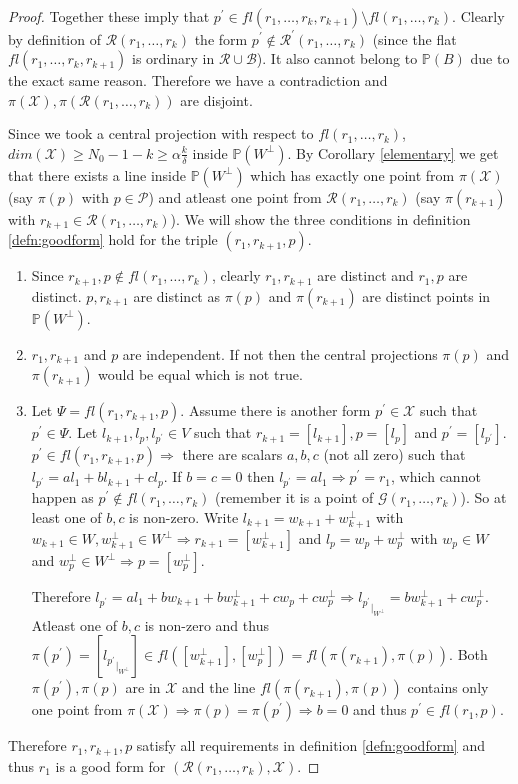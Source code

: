 \documentclass[12pt]{caltech_thesis}
\theoremstyle{plain}
\theoremstyle{definition}
\newcommand{\MB}{\mathcal{B}}
\newcommand{\MP}{\mathcal{P}}
\newcommand{\MR}{\mathcal{R}}
\newcommand{\MG}{\mathcal{G}}
\newcommand{\MX}{\mathcal{X}}
\newcommand{\PP}{\mathbb{P}}
\begin{document}
\begin{proof}
Together these imply that $p^\prime \in fl(r_1,\ldots,r_k,r_{k+1})\setminus fl(r_1,\ldots,r_k)$. Clearly by definition of $\MR(r_1,\ldots,r_k)$
the form $p^\prime\notin \MR^\prime(r_1,\ldots,r_k)$ (since the flat $fl(r_1,\ldots,r_k,r_{k+1})$ is ordinary in $\MR\cup \MB$). It also cannot 
belong to $\PP(B)$ due to the exact same reason. Therefore we have a contradiction and $\pi(\MX), \pi(\MR(r_1,\ldots,r_k))$ are disjoint.

Since we took a central projection with respect to $fl(r_1,\ldots,r_k)$, $dim(\MX) \geq N_0-1-k \geq \alpha \frac{k}{\delta}$ inside $\PP(W^\perp)$. By Corollary
\ref{elementary} we get that there exists a line inside $\PP(W^\perp)$ which has exactly one point from $\pi(\MX)$ (say $\pi(p)$ with $p\in \MP$)
and atleast one point from $\MR(r_1,\ldots,r_k)$ (say $\pi(r_{k+1})$ with $r_{k+1}\in \MR(r_1,\ldots,r_k)$). We will show the three conditions in
definition \ref{defn:goodform} hold for the triple $(r_1, r_{k+1}, p)$.
\begin{enumerate}
 \item Since $r_{k+1},p\notin fl(r_1,\ldots,r_k)$, clearly $r_1,r_{k+1}$ are distinct and $r_1,p$ are distinct. $p,r_{k+1}$ are distinct as
 $\pi(p)$ and $\pi(r_{k+1})$ are distinct points in $\PP(W^\perp)$.
 \item $r_1,r_{k+1}$ and $p$ are independent. If not then the central projections $\pi(p)$ and $\pi(r_{k+1})$ would be equal which is not true.
 \item Let $\Psi = fl(r_1,r_{k+1},p)$. Assume there is another form $p^\prime \in \MX$ such that $p^\prime \in \Psi$. 
 Let $l_{k+1},l_p,l_{p^\prime} \in
 V$ such that $r_{k+1} = [l_{k+1}], p = [l_p]$ and $p^\prime = [l_{p^\prime}]$. $p^\prime\in fl(r_1,r_{k+1},p) \Rightarrow$
 there are scalars $a,b,c$ (not all zero) such that $l_{p^\prime} = al_1 + bl_{k+1} + cl_p$. If $b=c=0$ then $l_{p^\prime} = al_1 \Rightarrow
 p^\prime = r_1$, which cannot happen as $p^\prime  \notin fl(r_1,\ldots,r_k)$ (remember it is a point of $\MG(r_1,\ldots,r_k)$). So 
 at least one of $b,c$ is non-zero. Write $l_{k+1} = w_{k+1} + w_{k+1}^\perp$ with $w_{k+1}\in W, w_{k+1}^\perp\in W^\perp \Rightarrow 
 r_{k+1} = [w_{k+1}^\perp]$ and
 $l_p = w_p + w_p^\perp$ with $w_p\in W$ and $w_p^\perp\in W^\perp \Rightarrow p = [w_p^\perp]$. 
 
 Therefore $l_{p^\prime} = al_1 + bw_{k+1} +bw_{k+1}^\perp + 
 cw_p + cw_p^\perp \Rightarrow {l_{p^\prime}}_{|_{W^\perp}} = bw_{k+1}^\perp + c w_p^\perp$. Atleast one of $b,c$ is non-zero and thus
 $\pi(p^\prime) = [{l_{p^\prime}}_{|_{W^\perp}}] \in fl([w_{k+1}^\perp], [w_p^\perp]) = fl(\pi(r_{k+1}), \pi(p))$. Both $\pi(p^\prime), \pi(p)$
 are in $\MX$ and the line $fl(\pi(r_{k+1}), \pi(p))$ contains only one point from $\pi(\MX) \Rightarrow \pi(p) = \pi(p^\prime)\Rightarrow b=0$
 and thus $p^\prime \in fl(r_1,p)$.
\end{enumerate}

Therefore $r_1,r_{k+1},p$ satisfy all requirements in definition \ref{defn:goodform} and thus $r_1$ is a good form for 
$(\MR(r_1,\ldots,r_k),\MX)$. 
\end{proof}
\end{document}
